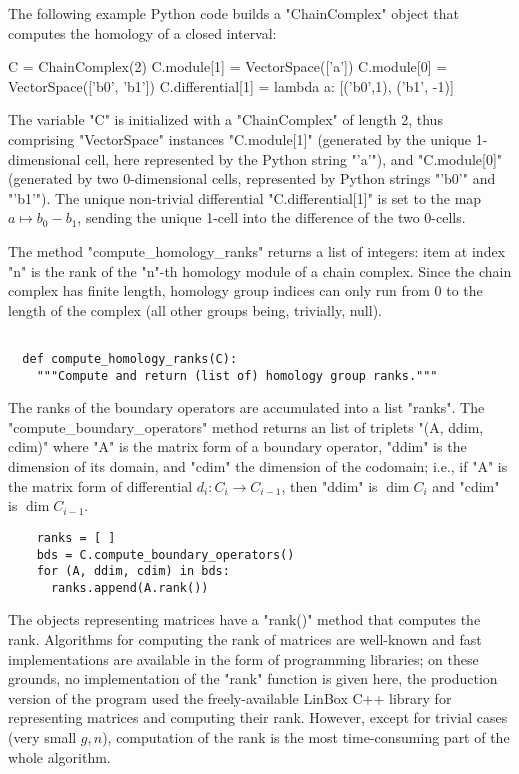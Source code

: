 The following example Python code builds a "ChainComplex" object that
computes the homology of a closed interval:
\begin{codexmp}
  C = ChainComplex(2)
  C.module[1] = VectorSpace(['a'])
  C.module[0] = VectorSpace(['b0', 'b1'])
  C.differential[1] = lambda a: [('b0',1), ('b1', -1)]
\end{codexmp}
The variable "C" is initialized with a "ChainComplex" of length 2,
thus comprising "VectorSpace" instances "C.module[1]" (generated by
the unique 1-dimensional cell, here represented by the Python string
"'a'"), and "C.module[0]" (generated by two 0-dimensional cells,
represented by Python strings "'b0'" and "'b1'").  The unique
non-trivial differential "C.differential[1]" is set to the map $a
\mapsto b_0 - b_1$, sending the unique 1-cell into the difference of
the two 0-cells.


The method "compute_homology_ranks" returns a list of integers: item
at index "n" is the rank of the "n"-th homology module of a chain
complex.  Since the chain complex has finite length, homology group
indices can only run from 0 to the length of the complex (all other
groups being, trivially, null).
\begin{lstlisting}

  def compute_homology_ranks(C):
    """Compute and return (list of) homology group ranks."""

\end{lstlisting}
The ranks of the boundary operators are accumulated into a list
"ranks".  The "compute_boundary_operators" method returns an list of
triplets "(A, ddim, cdim)" where "A" is the matrix form of a boundary
operator, "ddim" is the dimension of its domain, and "cdim" the
dimension of the codomain; i.e., if "A" is the matrix form of
differential $d_i: C_i \to C_{i-1}$, then "ddim" is $\dim C_i$ and
"cdim" is $\dim C_{i-1}$.
\begin{lstlisting}
    ranks = [ ]
    bds = C.compute_boundary_operators()
    for (A, ddim, cdim) in bds:
      ranks.append(A.rank())

\end{lstlisting}
The objects representing matrices have a "rank()" method that computes
the rank.  Algorithms for computing the rank of matrices are
well-known and fast implementations are available in
the form of programming libraries; on these grounds, no implementation
of the "rank" function is given here, the production version of the
program used the freely-available LinBox C++ library
for representing matrices and computing their rank. However, except
for trivial cases (very small $g,n$), computation of the rank is the
most time-consuming part of the whole algorithm.

